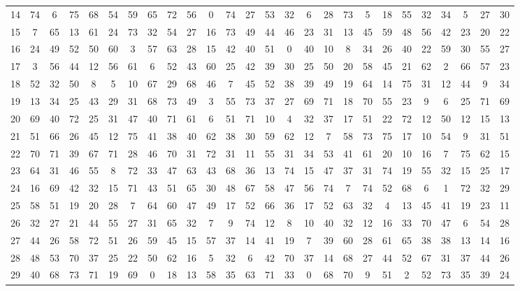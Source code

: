 \begin{table}
\begin{tabular}{c c c c c c c c c c c c c c c c c c c c c c c c c c }
14 & 74 & 6 & 75 & 68 & 54 & 59 & 65 & 72 & 56 & 0 & 74 & 27 & 53 & 32 & 6 & 28 & 73 & 5 & 18 & 55 & 32 & 34 & 5 & 27 & 30 \\
15 & 7 & 65 & 13 & 61 & 24 & 73 & 32 & 54 & 27 & 16 & 73 & 49 & 44 & 46 & 23 & 31 & 13 & 45 & 59 & 48 & 56 & 42 & 23 & 20 & 22 \\
16 & 24 & 49 & 52 & 50 & 60 & 3 & 57 & 63 & 28 & 15 & 42 & 40 & 51 & 0 & 40 & 10 & 8 & 34 & 26 & 40 & 22 & 59 & 30 & 55 & 27 \\
17 & 3 & 56 & 44 & 12 & 56 & 61 & 6 & 52 & 43 & 60 & 25 & 42 & 39 & 30 & 25 & 50 & 20 & 58 & 45 & 21 & 62 & 2 & 66 & 57 & 23 \\
18 & 52 & 32 & 50 & 8 & 5 & 10 & 67 & 29 & 68 & 46 & 7 & 45 & 52 & 38 & 39 & 49 & 19 & 64 & 14 & 75 & 31 & 12 & 44 & 9 & 34 \\
19 & 13 & 34 & 25 & 43 & 29 & 31 & 68 & 73 & 49 & 3 & 55 & 73 & 37 & 27 & 69 & 71 & 18 & 70 & 55 & 23 & 9 & 6 & 25 & 71 & 69 \\
20 & 69 & 40 & 72 & 25 & 31 & 47 & 40 & 71 & 61 & 6 & 51 & 71 & 10 & 4 & 32 & 37 & 17 & 51 & 22 & 72 & 12 & 50 & 12 & 15 & 13 \\
21 & 51 & 66 & 26 & 45 & 12 & 75 & 41 & 38 & 40 & 62 & 38 & 30 & 59 & 62 & 12 & 7 & 58 & 73 & 75 & 17 & 10 & 54 & 9 & 31 & 51 \\
22 & 70 & 71 & 39 & 67 & 71 & 28 & 46 & 70 & 31 & 72 & 31 & 11 & 55 & 31 & 34 & 53 & 41 & 61 & 20 & 10 & 16 & 7 & 75 & 62 & 15 \\
23 & 64 & 31 & 46 & 55 & 8 & 72 & 33 & 47 & 63 & 43 & 68 & 36 & 13 & 74 & 15 & 47 & 37 & 31 & 74 & 19 & 55 & 32 & 15 & 25 & 17 \\
24 & 16 & 69 & 42 & 32 & 15 & 71 & 43 & 51 & 65 & 30 & 48 & 67 & 58 & 47 & 56 & 74 & 7 & 74 & 52 & 68 & 6 & 1 & 72 & 32 & 29 \\
25 & 58 & 51 & 19 & 20 & 28 & 7 & 64 & 60 & 47 & 49 & 17 & 52 & 66 & 36 & 17 & 52 & 63 & 32 & 4 & 13 & 45 & 41 & 19 & 23 & 11 \\
26 & 32 & 27 & 21 & 44 & 55 & 27 & 31 & 65 & 32 & 7 & 9 & 74 & 12 & 8 & 10 & 40 & 32 & 12 & 16 & 33 & 70 & 47 & 6 & 54 & 28 \\
27 & 44 & 26 & 58 & 72 & 51 & 26 & 59 & 45 & 15 & 57 & 37 & 14 & 41 & 19 & 7 & 39 & 60 & 28 & 61 & 65 & 38 & 38 & 13 & 14 & 16 \\
28 & 48 & 53 & 70 & 37 & 25 & 22 & 50 & 62 & 16 & 5 & 32 & 6 & 42 & 70 & 37 & 14 & 68 & 27 & 44 & 52 & 67 & 31 & 37 & 44 & 26 \\
29 & 40 & 68 & 73 & 71 & 19 & 69 & 0 & 18 & 13 & 58 & 35 & 63 & 71 & 33 & 0 & 68 & 70 & 9 & 51 & 2 & 52 & 73 & 35 & 39 & 24 \\

\end{tabular}
\end{table}
